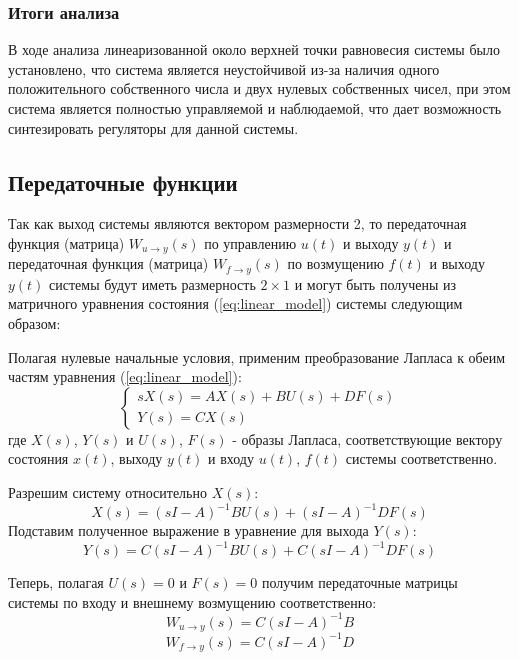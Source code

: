 \subsubsection{Итоги анализа}
В ходе анализа линеаризованной около верхней точки равновесия системы было установлено, что система является
неустойчивой из-за наличия одного положительного собственного числа и двух нулевых собственных чисел, при этом 
система является полностью управляемой и наблюдаемой, что дает возможность синтезировать регуляторы для 
данной системы. 

\subsection{Передаточные функции}
Так как выход системы являются вектором размерности 2, то передаточная функция (матрица) $W_{u\rightarrow y}(s)$ по 
управлению $u(t)$ и выходу $y(t)$ и передаточная функция (матрица) $W_{f\rightarrow y}(s)$ по 
возмущению $f(t)$ и выходу $y(t)$ системы будут иметь размерность $2 \times 1$ и могут быть получены из матричного уравнения состояния
(\ref{eq:linear_model}) системы следующим образом:

Полагая нулевые начальные условия, применим преобразование Лапласа к обеим частям уравнения (\ref{eq:linear_model}): 
\begin{equation}
    \begin{cases}
        sX(s) = AX(s) + BU(s) + DF(s) \\ 
        Y(s) = CX(s)
    \end{cases}
\end{equation}
где $X(s)$, $Y(s)$ и $U(s)$, $F(s)$ - образы Лапласа, соответствующие вектору состояния $x(t)$, выходу $y(t)$ и входу $u(t)$, $f(t)$ системы соответственно.

Разрешим систему относительно $X(s)$:
\begin{equation}
    X(s) = (sI - A)^{-1}BU(s) + (sI - A)^{-1}DF(s)
\end{equation}
Подставим полученное выражение в уравнение для выхода $Y(s)$:
\begin{equation}
    Y(s) = C(sI - A)^{-1}BU(s) + C(sI - A)^{-1}DF(s)
\end{equation}

Теперь, полагая $U(s) = 0$ и $F(s) = 0$ получим передаточные матрицы системы по входу и внешнему возмущению соответственно:
\begin{equation}
    W_{u\rightarrow y}(s) = C(sI - A)^{-1}B
\end{equation}
\begin{equation}
    W_{f\rightarrow y}(s) = C(sI - A)^{-1}D
\end{equation}

